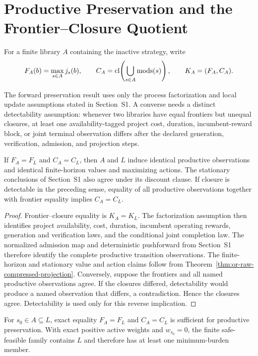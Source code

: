 \section{Productive Preservation and the Frontier--Closure Quotient}
\label{sec:or-productive-equivalence}

For a finite library $A$ containing the inactive strategy, write
\[
 F_A(b)=\max_{s\in A}j_s(b),\qquad
 C_A=\operatorname{cl}\!\left(\bigcup_{s\in A}\operatorname{mods}(s)\right),\qquad
 K_A=(F_A,C_A).
\]

The forward preservation result uses only the process factorization and local
update assumptions stated in Section~S1. A converse needs a distinct
detectability assumption: whenever two libraries have equal frontiers but
unequal closures, at least one availability-tagged project cost, duration,
incumbent-reward block, or joint terminal observation differs after the
declared generation, verification, admission, and projection steps.

\begin{theorem}
\label{thm:or-frontier-closure-characterization}
If $F_A=F_L$ and $C_A=C_L$, then $A$ and $L$ induce identical
productive observations and identical finite-horizon values and maximizing
actions. The stationary conclusions of Section~S1 also agree under its
discount clause. If closure is detectable in the preceding sense, equality
of all productive observations together with frontier equality implies
$C_A=C_L$.
\end{theorem}

\begin{proof}
Frontier--closure equality is $K_A=K_L$. The factorization assumption then
identifies project availability, cost, duration, incumbent operating rewards,
generation and verification laws, and the conditional joint completion law.
The normalized admission map and deterministic pushforward from Section~S1
therefore identify the complete productive transition observations. The
finite-horizon and stationary value and action claims follow from
Theorem~\ref{thm:or-raw-compressed-projection}. Conversely, suppose the
frontiers and all named productive observations agree. If the closures
differed, detectability would produce a named observation that differs, a
contradiction. Hence the closures agree. Detectability is used only for this
reverse implication.
\end{proof}

\begin{corollary}
\label{cor:or-safe-compression}
For $s_0\in A\subseteq L$, exact equality $F_A=F_L$ and $C_A=C_L$
is sufficient for productive preservation. With exact positive active
weights and $w_{s_0}=0$, the finite safe-feasible family contains $L$
and therefore has at least one minimum-burden member.
\end{corollary}

